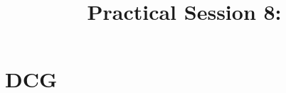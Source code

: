 \documentclass{../../../tp}
\title{Practical Session 8: \prolog}
\author{}
\begin{document}
	
	\maketitle
	
\section{DCG}	
\end{document}

